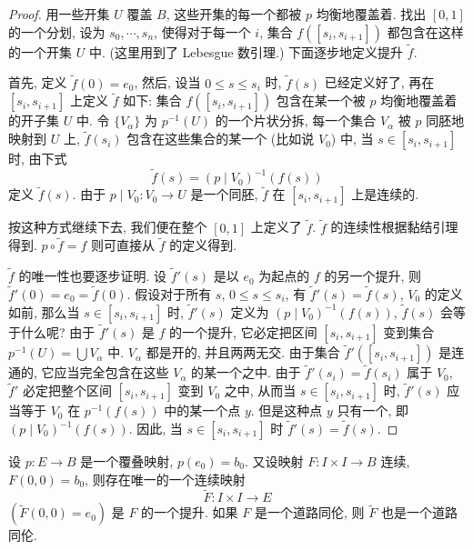 \begin{proof}
用一些开集 $U$ 覆盖 $B$, 这些开集的每一个都被 $p$ 均衡地覆盖着. 找出 $[0,1]$ 的一个分划, 设为 $s_0,\cdots,s_n$, 使得对于每一个 $i$, 集合 $f([s_i,s_{i+1}])$ 都包含在这样的一个开集 $U$ 中. (这里用到了 Lebesgue 数引理.) 下面逐步地定义提升 $\tilde{f}$.

首先, 定义 $\tilde{f}(0)=e_0$, 然后, 设当 $0\leqslant s\leqslant s_i$ 时, $\tilde{f}(s)$ 已经定义好了, 再在 $[s_i,s_{i+1}]$ 上定义 $\tilde{f}$ 如下: 集合 $f([s_i,s_{i+1}])$ 包含在某一个被 $p$ 均衡地覆盖着的开子集 $U$ 中. 令 $\{V_\alpha\}$ 为 $p^{-1}(U)$ 的一个片状分拆, 每一个集合 $V_\alpha$ 被 $p$ 同胚地映射到 $U$ 上, $\tilde{f}(s_i)$ 包含在这些集合的某一个 (比如说 $V_0$) 中, 当 $s\in[s_i,s_{i+1}]$ 时, 由下式
\[
\tilde{f}(s)=(p\mid V_{0})^{-1}(f(s))
\]
定义 $\tilde{f}(s)$. 由于 $p\mid V_0\colon V_0\to U$ 是一个同胚, $\tilde{f}$ 在 $[s_i,s_{i+1}]$ 上是连续的.

按这种方式继续下去, 我们便在整个 $[0,1]$ 上定义了 $\tilde{f}$. $\tilde{f}$ 的连续性根据黏结引理得到. $p\circ\tilde{f}=f$ 则可直接从 $\tilde{f}$ 的定义得到.

$\tilde{f}$ 的唯一性也要逐步证明. 设 $\tilde{f}'(s)$ 是以 $e_0$ 为起点的 $f$ 的另一个提升, 则 $\tilde{f}'(0)=e_0=\tilde{f}(0)$. 假设对于所有 $s$, $0\leqslant s\leqslant s_i$, 有 $\tilde{f}'(s)=\tilde{f}(s)$, $V_0$ 的定义如前, 那么当 $s\in[s_i,s_{i+1}]$ 时, $\tilde{f}'(s)$ 定义为 $(p\mid V_0)^{-1}(f(s))$, $\tilde{f}(s)$ 会等于什么呢? 由于 $\tilde{f}'(s)$ 是 $f$ 的一个提升, 它必定把区间 $[s_i,s_{i+1}]$ 变到集合 $p^{-1}(U)=\bigcup V_\alpha$ 中. $V_\alpha$ 都是开的, 并且两两无交. 由于集合 $\tilde{f}'([s_i,s_{i+1}])$ 是连通的, 它应当完全包含在这些 $V_\alpha$ 的某一个之中. 由于 $\tilde{f}'(s_i)=\tilde{f}(s_i)$ 属于 $V_0$, $\tilde{f}'$ 必定把整个区间 $[s_i,s_{i+1}]$ 变到 $V_0$ 之中, 从而当 $s\in[s_i,s_{i+1}]$ 时, $\tilde{f}'(s)$ 应当等于 $V_0$ 在 $p^{-1}(f(s))$ 中的某一个点 $y$. 但是这种点 $y$ 只有一个, 即 $(p\mid V_0)^{-1}(f(s))$. 因此, 当 $s\in[s_i,s_{i+1}]$ 时 $\tilde{f}'(s)=\tilde{f}(s)$.
\end{proof}

\begin{lemma}[同伦提升引理]
\label{lemma:ch09-sec54-54-2}
设 $p\colon E\to B$ 是一个覆叠映射, $p(e_0)=b_0$. 又设映射 $F\colon I\times I\to B$ 连续, $F(0,0)=b_0$, 则存在唯一的一个连续映射
\[
\widetilde{F}\colon I\times I\longrightarrow E
\]
$(\widetilde{F}(0,0)=e_0)$ 是 $F$ 的一个提升. 如果 $F$ 是一个道路同伦, 则 $\widetilde{F}$ 也是一个道路同伦.
\end{lemma}

